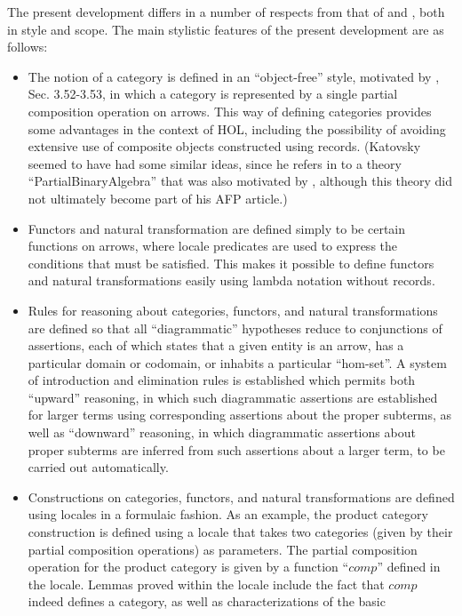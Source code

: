 \documentclass[11pt,notitlepage,a4paper]{report}
\begin{document}
The present development differs in a number of respects from that of
\cite{OKeefe-AFP05} and \cite{Katovsky-AFP10}, both in style and scope.
The main stylistic features of the present development are as follows:
\begin{itemize}
\item  The notion of a category is defined in an ``object-free'' style,
  motivated by \cite{AHS}, Sec. 3.52-3.53, in which a category is represented by a
  single partial composition operation on arrows.
  This way of defining categories provides some advantages in the context of HOL,
  including the possibility of avoiding extensive use of composite objects constructed
  using records.
  (Katovsky seemed to have had some similar ideas, since he refers in
  \cite{Katovsky-CatThy10} to a theory ``PartialBinaryAlgebra'' that was also motivated
  by \cite{AHS}, although this theory did not ultimately become part of his AFP article.)
\item  Functors and natural transformation are defined simply to be certain
  functions on arrows, where locale predicates are used to express the conditions
  that must be satisfied.  This makes it possible to define functors and natural
  transformations easily using lambda notation without records.
\item  Rules for reasoning about categories, functors, and natural transformations
  are defined so that all ``diagrammatic'' hypotheses reduce to conjunctions of
  assertions, each of which states that a given entity is an arrow, has a particular
  domain or codomain, or inhabits a particular ``hom-set''.  A system of introduction
  and elimination rules is established which permits both ``upward'' reasoning,
  in which such diagrammatic assertions are established for larger terms using corresponding
  assertions about the proper subterms, as well as ``downward'' reasoning, in which diagrammatic
  assertions about proper subterms are inferred from such assertions about a larger
  term, to be carried out automatically.
\item  Constructions on categories, functors, and natural transformations are defined
  using locales in a formulaic fashion.
  As an example, the product category construction is defined using a locale that
  takes two categories (given by their partial composition operations) as parameters.
  The partial composition operation for the product category is given by a function
  ``$comp$'' defined in the locale.  Lemmas proved within the locale include the fact
  that $comp$ indeed defines a category, as well as characterizations of the basic

\end{itemize}
\end{document}
